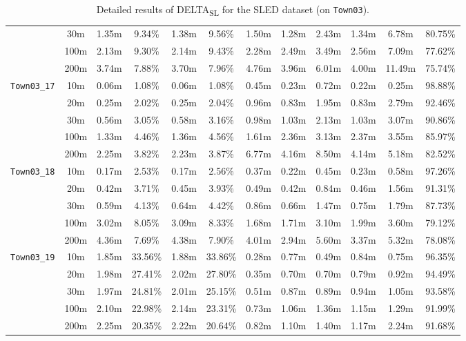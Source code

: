 \begin{table}
{\begin{tabular}{@{}cccccccccccc@{}}
      & 30m & 1.35m & 9.34\% & 1.38m & 9.56\% & 1.50m & 1.28m & 2.43m & 1.34m & 6.78m & 80.75\% \\
      & 100m & 2.13m & 9.30\% & 2.14m & 9.43\% & 2.28m & 2.49m & 3.49m & 2.56m & 7.09m & 77.62\% \\
      & 200m & 3.74m & 7.88\% & 3.70m & 7.96\% & 4.76m & 3.96m & 6.01m & 4.00m & 11.49m & 75.74\% \\
      \midrule
      \multirow{5}{*}{\Verb|Town03_17|} & 10m & 0.06m & 1.08\% & 0.06m & 1.08\% & 0.45m & 0.23m & 0.72m & 0.22m & 0.25m & 98.88\% \\
      & 20m & 0.25m & 2.02\% & 0.25m & 2.04\% & 0.96m & 0.83m & 1.95m & 0.83m & 2.79m & 92.46\% \\
      & 30m & 0.56m & 3.05\% & 0.58m & 3.16\% & 0.98m & 1.03m & 2.13m & 1.03m & 3.07m & 90.86\% \\
      & 100m & 1.33m & 4.46\% & 1.36m & 4.56\% & 1.61m & 2.36m & 3.13m & 2.37m & 3.55m & 85.97\% \\
      & 200m & 2.25m & 3.82\% & 2.23m & 3.87\% & 6.77m & 4.16m & 8.50m & 4.14m & 5.18m & 82.52\% \\
      \midrule
      \multirow{5}{*}{\Verb|Town03_18|} & 10m & 0.17m & 2.53\% & 0.17m & 2.56\% & 0.37m & 0.22m & 0.45m & 0.23m & 0.58m & 97.26\% \\
      & 20m & 0.42m & 3.71\% & 0.45m & 3.93\% & 0.49m & 0.42m & 0.84m & 0.46m & 1.56m & 91.31\% \\
      & 30m & 0.59m & 4.13\% & 0.64m & 4.42\% & 0.86m & 0.66m & 1.47m & 0.75m & 1.79m & 87.73\% \\
      & 100m & 3.02m & 8.05\% & 3.09m & 8.33\% & 1.68m & 1.71m & 3.10m & 1.99m & 3.60m & 79.12\% \\
      & 200m & 4.36m & 7.69\% & 4.38m & 7.90\% & 4.01m & 2.94m & 5.60m & 3.37m & 5.32m & 78.08\% \\
      \midrule
      \multirow{5}{*}{\Verb|Town03_19|} & 10m & 1.85m & 33.56\% & 1.88m & 33.86\% & 0.28m & 0.77m & 0.49m & 0.84m & 0.75m & 96.35\% \\
      & 20m & 1.98m & 27.41\% & 2.02m & 27.80\% & 0.35m & 0.70m & 0.70m & 0.79m & 0.92m & 94.49\% \\
      & 30m & 1.97m & 24.81\% & 2.01m & 25.15\% & 0.51m & 0.87m & 0.89m & 0.94m & 1.05m & 93.58\% \\
      & 100m & 2.10m & 22.98\% & 2.14m & 23.31\% & 0.73m & 1.06m & 1.36m & 1.15m & 1.29m & 91.99\% \\
      & 200m & 2.25m & 20.35\% & 2.22m & 20.64\% & 0.82m & 1.10m & 1.40m & 1.17m & 2.24m & 91.68\% \\
      \bottomrule
    \end{tabular}
  }
  \cprotect\caption{Detailed results of DELTA\textsubscript{SL} for the SLED dataset (on \verb|Town03|).}\label{tab:appendix:delta:full_res_sled_town03}
\end{table}


